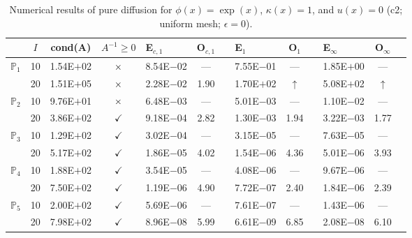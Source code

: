 \begin{table}[H]
\centering
\caption{Numerical results of pure diffusion for $\phi(x)=\exp(x)$, $\kappa(x)=1$, and $u(x)=0$ (c2; uniform mesh; $\epsilon=0$).}
\begin{tabular}{@{}l c c c l c c l c c l c c@{}}
\toprule
 & $I$ & cond(A) & $A^{-1}\geq 0$ &  E$_{c,1}$ & O$_{c,1}$ && E$_1$ & O$_1$ && E$_{\infty}$ & O$_{\infty}$\\
\midrule
\multirow{2}{*}{$\mathbb{P}_{1}$}
 & 10 & 1.54E$+$02 & $\times$ & 8.54E$-$02 & --- && 7.55E$-$01 & --- && 1.85E$+$00 & ---\\
 & 20 & 1.51E$+$05 & $\times$ & 2.28E$-$02 & 1.90 && 1.70E$+$02 & $\uparrow$ && 5.08E$+$02 & $\uparrow$\\
\midrule
\multirow{2}{*}{$\mathbb{P}_{2}$}
 & 10 & 9.76E$+$01 & $\times$ & 6.48E$-$03 & --- && 5.01E$-$03 & --- && 1.10E$-$02 & ---\\
 & 20 & 3.86E$+$02 & $\checkmark$ & 9.18E$-$04 & 2.82 && 1.30E$-$03 & 1.94 && 3.22E$-$03 & 1.77\\
\midrule
\multirow{2}{*}{$\mathbb{P}_{3}$}
 & 10 & 1.29E$+$02 & $\checkmark$ & 3.02E$-$04 & --- && 3.15E$-$05 & --- && 7.63E$-$05 & ---\\
 & 20 & 5.17E$+$02 & $\checkmark$ & 1.86E$-$05 & 4.02 && 1.54E$-$06 & 4.36 && 5.01E$-$06 & 3.93\\
\midrule
\multirow{2}{*}{$\mathbb{P}_{4}$}
 & 10 & 1.88E$+$02 & $\checkmark$ & 3.54E$-$05 & --- && 4.08E$-$06 & --- && 9.67E$-$06 & ---\\
 & 20 & 7.50E$+$02 & $\checkmark$ & 1.19E$-$06 & 4.90 && 7.72E$-$07 & 2.40 && 1.84E$-$06 & 2.39\\
\midrule
\multirow{2}{*}{$\mathbb{P}_{5}$}
 & 10 & 2.00E$+$02 & $\checkmark$ & 5.69E$-$06 & --- && 7.61E$-$07 & --- && 1.43E$-$06 & ---\\
 & 20 & 7.98E$+$02 & $\checkmark$ & 8.96E$-$08 & 5.99 && 6.61E$-$09 & 6.85 && 2.08E$-$08 & 6.10\\
\bottomrule
\end{tabular}
\end{table}